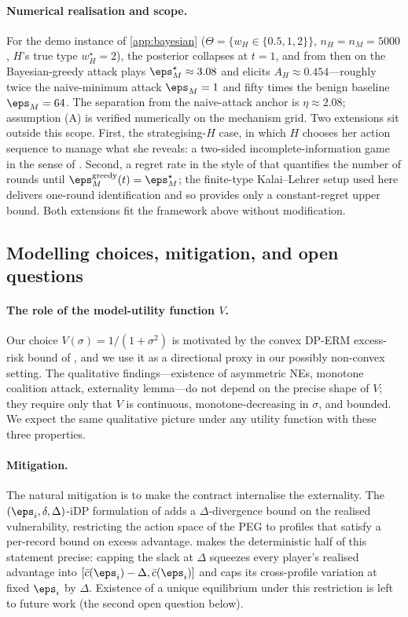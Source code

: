 \paragraph{Numerical realisation and scope.} For the demo instance of
\cref{app:bayesian} ($\Theta = \{w_H \in \{0.5, 1, 2\}\}$, $n_H = n_M
= 5000$, $H$'s true type $w_H^\star = 2$), the posterior collapses at
$t = 1$, and from then on the Bayesian-greedy attack plays
$\eps_M^\star \approx 3.08$ and elicits $A_H \approx 0.454$---roughly
twice the naive-minimum attack $\eps_M = 1$ and fifty times the
benign baseline $\eps_M = 64$. The separation from the naive-attack
anchor is $\eta \approx 2.08$; assumption (A) is verified numerically
on the mechanism grid. Two extensions sit outside this scope. First,
the strategising-$H$ case, in which $H$ chooses her action sequence to
manage what she reveals: a two-sided incomplete-information game in
the sense of \citet{aumann1995repeated}. Second, a regret rate in the
style of \citet{balcan2015commitment, blum2014learning} that quantifies
the number of rounds until $\eps_M^{\mathrm{greedy}}(t) =
\eps_M^\star$; the finite-type Kalai--Lehrer setup used here delivers
one-round identification and so provides only a constant-regret upper
bound. Both extensions fit the framework above without modification.

\subsection{Modelling choices, mitigation, and open questions}

\paragraph{The role of the model-utility function $V$.} Our choice $V(\sigma)
= 1/(1+\sigma^2)$ is motivated by the convex DP-ERM excess-risk bound of
\citet{bassily2014private}, and we use it as a directional proxy in our
possibly non-convex setting. The qualitative findings---existence of
asymmetric NEs, monotone coalition attack, externality lemma---do not depend
on the precise shape of $V$; they require only that $V$ is continuous,
monotone-decreasing in $\sigma$, and bounded. We expect the same qualitative
picture under any utility function with these three properties.

\paragraph{Mitigation.} The natural mitigation is to make the contract
internalise the externality. The $(\eps_i, \delta, \Delta)$-iDP formulation
of \citet{kaissis2024beyond} adds a $\Delta$-divergence bound on the realised
vulnerability, restricting the action space of the PEG to profiles that
satisfy a per-record bound on excess advantage.
 makes the deterministic half of this
statement precise: capping the slack at $\Delta$ squeezes every player's
realised advantage into $[\bar c(\eps_i)-\Delta, \bar c(\eps_i)]$ and
caps its cross-profile variation at fixed $\eps_i$ by $\Delta$. Existence
of a unique equilibrium under this restriction is left to future work
(the second open question below).

